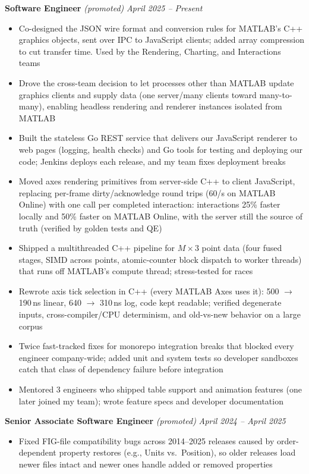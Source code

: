 \documentclass{article}
\begin{document}
{\large \textbf{Software Engineer}} \textit{(promoted)} \hfill \textit{April 2025 -- Present}
\begin{itemize}[leftmargin=*]
    \item Co-designed the JSON wire format and conversion rules for MATLAB's C++ graphics objects, sent over IPC to JavaScript clients; added array compression to cut transfer time. Used by the Rendering, Charting, and Interactions teams
    \item Drove the cross-team decision to let processes other than MATLAB update graphics clients and supply data (one server\slash many clients toward many-to-many), enabling headless rendering and renderer instances isolated from MATLAB
    \item Built the stateless Go REST service that delivers our JavaScript renderer to web pages (logging, health checks) and Go tools for testing and deploying our code; Jenkins deploys each release, and my team fixes deployment breaks
    \item Moved axes rendering primitives from server-side C++ to client JavaScript, replacing per-frame dirty/acknowledge round trips (60/s on MATLAB Online) with one call per completed interaction: interactions 25\% faster locally and 50\% faster on MATLAB Online, with the server still the source of truth (verified by golden tests and QE)
    \item Shipped a multithreaded C++ pipeline for $M \times 3$ point data (four fused stages, SIMD across points, atomic-counter block dispatch to worker threads) that runs off MATLAB's compute thread; stress-tested for races
    \item Rewrote axis tick selection in C++ (every MATLAB Axes uses it): 500 $\to$ 190\,ns linear, 640 $\to$ 310\,ns log, code kept readable; verified degenerate inputs, cross-compiler/CPU determinism, and old-vs-new behavior on a large corpus
    \item Twice fast-tracked fixes for monorepo integration breaks that blocked every engineer company-wide; added unit and system tests so developer sandboxes catch that class of dependency failure before integration
    \item Mentored 3 engineers who shipped table support and animation features (one later joined my team); wrote feature specs and developer documentation
\end{itemize}

{\large \textbf{Senior Associate Software Engineer}} \textit{(promoted)} \hfill \textit{April 2024 -- April 2025}
\begin{itemize}[leftmargin=*]
    \item Fixed FIG-file compatibility bugs across 2014--2025 releases caused by order-dependent property restores (e.g., Units vs.\ Position), so older releases load newer files intact and newer ones handle added or removed properties
\end{itemize}
\end{document}
